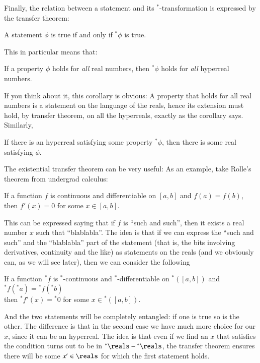 \documentclass[adraft, copyright,creativecommons,sharealike,noncommercial]{eptcs}
\newcommand{\nstar}{{^*}}
\begin{document}
Finally, the relation between a statement and its $\nstar$-transformation is expressed by the transfer theorem:
\begin{theorem}
	A statement $\phi$ is true if and only if $\nstar \phi$ is true.
\end{theorem}
%
This in particular means that:
\begin{theorem}
	If a property $\phi$ holds for \emph{all} real numbers, then $\nstar \phi$ holds for \emph{all} hyperreal numbers.
\end{theorem}
%
If you think about it, this corollary is obvious: A property that holds for all real numbers is a statement on the language of the reals, hence its extension must hold, by transfer theorem, on all the hyperreals, exactly as the corollary says. Similarly,
\begin{theorem}
	If there is an hyperreal satisfying some property $\nstar \phi$, then there is some real satisfying $\phi$.
\end{theorem}
%
\begin{example}
	The existential transfer theorem can be very useful: As an example, take Rolle's theorem from undergrad calculus:
	\begin{center}
		If a function $f$ is continuous and differentiable on $[a,b]$ and $f(a) = f(b)$, then $f'(x) = 0$ for some $x \in [a,b]$.
	\end{center}
	This can be expressed saying that if $f$ is ``such and such'', then it exists a real number $x$ such that ``blablabla''. The idea is that if we can express the ``such and such'' and the ``blablabla'' part of the statement (that is, the bits involving derivatives, continuity and the like) as statements on the reals (and we obviously can, as we will see later), then we can consider the following
	\begin{center}
		If a function $\nstar f$ is $\nstar$-continuous and $\nstar$-differentiable on $\nstar([ a,b])$ and $\nstar f(\nstar a) = \nstar f(\nstar b)$\\
		then $\nstar f'(x) = \nstar 0$ for some $x \in \nstar([ a,b])$.
	\end{center}
	And the two statements will be completely entangled: if one is true so is the other. The difference is that in the second case we have much more choice for our $x$, since it can be an hyperreal. The idea is that even if we find an $x$ that satisfies the condition turns out to be in $\nstar \reals - \nstar \reals$, the transfer theorem ensures there will be some $x' \in \reals$ for which the first statement holds.
\end{example}
\end{document}
